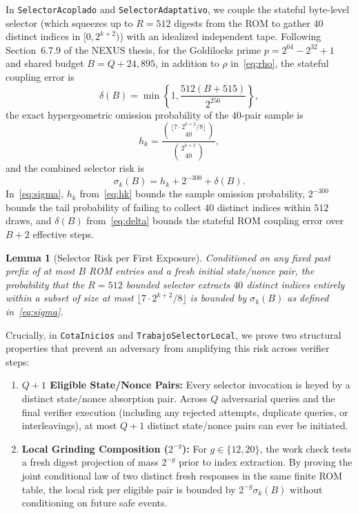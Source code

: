 \documentclass[conference]{IEEEtran}
\newtheorem{lemma}{Lemma}
\theoremstyle{definition}
\begin{document}
In \texttt{SelectorAcoplado} and \texttt{SelectorAdaptativo}, we couple the stateful byte-level selector (which squeezes up to $R = 512$ digests from the ROM to gather $40$ distinct indices in $[0, 2^{k+2})$) with an idealized independent tape. Following Section~6.7.9 of the NEXUS thesis, for the Goldilocks prime $p = 2^{64} - 2^{32} + 1$ and shared budget $B = Q + 24{,}895$, in addition to $\rho$ in~\eqref{eq:rho}, the stateful coupling error is
\begin{equation}
\label{eq:delta}
\delta(B) = \min\left\{1, \frac{512(B + 515)}{2^{256}}\right\},
\end{equation}
the exact hypergeometric omission probability of the $40$-pair sample is
\begin{equation}
\label{eq:hk}
h_k = \frac{\binom{\lfloor 7 \cdot 2^{k+2} / 8 \rfloor}{40}}{\binom{2^{k+2}}{40}},
\end{equation}
and the combined selector risk is
\begin{equation}
\label{eq:sigma}
\sigma_k(B) = h_k + 2^{-300} + \delta(B).
\end{equation}
In~\eqref{eq:sigma}, $h_k$ from~\eqref{eq:hk} bounds the sample omission probability, $2^{-300}$ bounds the tail probability of failing to collect $40$ distinct indices within $512$ draws, and $\delta(B)$ from~\eqref{eq:delta} bounds the stateful ROM coupling error over $B + 2$ effective steps.

\begin{lemma}[Selector Risk per First Exposure]
\label{lem:selector}
Conditioned on any fixed past prefix of at most $B$ ROM entries and a fresh initial state/nonce pair, the probability that the $R = 512$ bounded selector extracts $40$ distinct indices entirely within a subset of size at most $\lfloor 7 \cdot 2^{k+2} / 8 \rfloor$ is bounded by $\sigma_k(B)$ as defined in~\eqref{eq:sigma}.
\end{lemma}

Crucially, in \texttt{CotaInicios} and \texttt{TrabajoSelectorLocal}, we prove two structural properties that prevent an adversary from amplifying this risk across verifier steps:
\begin{enumerate}
    \setlength{\itemsep}{2pt}
    \item \textbf{$Q + 1$ Eligible State/Nonce Pairs:} Every selector invocation is keyed by a distinct state/nonce absorption pair. Across $Q$ adversarial queries and the final verifier execution (including any rejected attempts, duplicate queries, or interleavings), at most $Q + 1$ distinct state/nonce pairs can ever be initiated.
    \item \textbf{Local Grinding Composition ($2^{-g}$):} For $g \in \{12, 20\}$, the work check tests a fresh digest projection of mass $2^{-g}$ prior to index extraction. By proving the joint conditional law of two distinct fresh responses in the same finite ROM table, the local risk per eligible pair is bounded by $2^{-g} \sigma_k(B)$ without conditioning on future safe events.
\end{enumerate}
\end{document}
